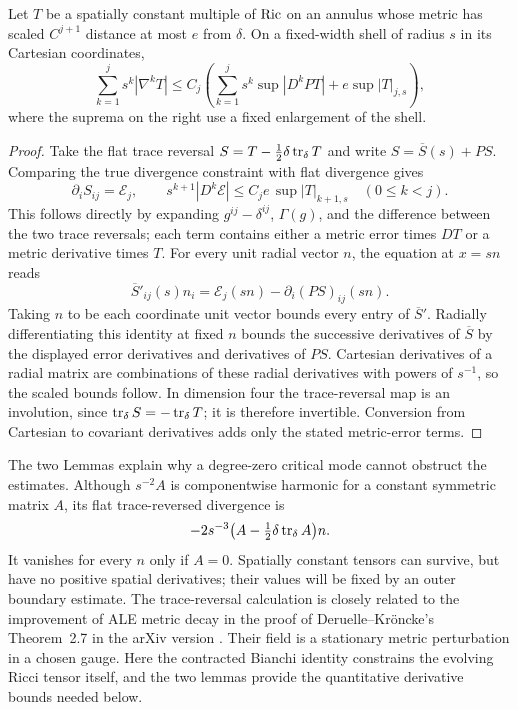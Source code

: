 \begin{lemma}
\label{para:mean-lemma}
Let $T$ be a spatially constant multiple of $\operatorname{Ric}$ on an annulus whose
metric has scaled $C^{j+1}$ distance at most $e$ from $\delta$.
On a fixed-width shell of radius $s$ in its Cartesian coordinates,
\begin{equation}
 \sum_{k=1}^j s^k|\nabla^kT|
 \le C_j\left(\sum_{k=1}^j s^k\sup|D^kPT|
              +e\sup|T|_{j,s}\right),
 \label{para:mean-derivatives}
\end{equation}
where the suprema on the right use a fixed enlargement of the shell.
\end{lemma}

\begin{proof}
Take the flat trace reversal
$S=T-\tfrac12\delta\operatorname{tr}_\delta T$ and write
$S=\overline S(s)+PS$.  Comparing the true divergence constraint
with flat divergence gives
\[
 \partial_iS_{ij}=\mathcal E_j,\qquad
 s^{k+1}|D^k\mathcal E|
 \le C_j e\,\sup|T|_{k+1,s}\quad(0\le k<j).
\]
This follows directly by expanding $g^{ij}-\delta^{ij}$,
$\Gamma(g)$, and the difference between the two trace reversals;
each term contains either a metric error times $DT$ or a metric
derivative times $T$.
For every unit radial vector $n$, the equation at $x=sn$ reads
\[
 \overline S'_{ij}(s)n_i
    =\mathcal E_j(sn)-\partial_i(PS)_{ij}(sn).
\]
Taking $n$ to be each coordinate unit vector bounds every entry
of $\overline S'$.  Radially differentiating this identity at fixed
$n$ bounds the successive derivatives of $\overline S$ by the
displayed error derivatives and derivatives of $PS$.  Cartesian
derivatives of a radial matrix are combinations of these radial
derivatives with powers of $s^{-1}$, so the scaled bounds follow.
In dimension four the trace-reversal map is an involution, since
$\operatorname{tr}_\delta S=-\operatorname{tr}_\delta T$; it is therefore invertible.
Conversion from Cartesian to covariant derivatives adds only the
stated metric-error terms.
\end{proof}

The two Lemmas explain why a degree-zero critical mode cannot obstruct
the estimates.  Although $s^{-2}A$ is componentwise harmonic for a
constant symmetric matrix $A$, its flat trace-reversed divergence is
\[
 -2s^{-3}\bigl(A-\tfrac12\delta\operatorname{tr}_\delta A\bigr)n.
\]
It vanishes for every $n$ only if $A=0$.  Spatially constant tensors
can survive, but have no positive spatial derivatives; their values
will be fixed by an outer boundary estimate.
The trace-reversal calculation is closely related to the improvement
of ALE metric decay in the proof of Deruelle--Kr\"oncke's
Theorem~2.7 in the arXiv version \cite{DeruelleKroncke2021}.
Their field is a stationary
metric perturbation in a chosen gauge. Here the contracted Bianchi
identity constrains the evolving Ricci tensor itself, and the two
lemmas provide the quantitative derivative bounds needed below.

